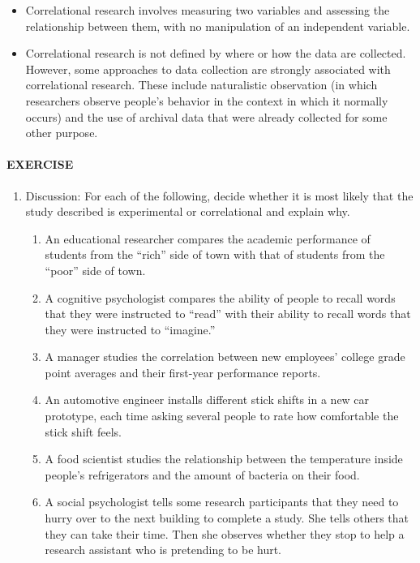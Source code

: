 \documentclass[
]{krantz}
\providecommand{\tightlist}{%
  \setlength{\itemsep}{0pt}\setlength{\parskip}{0pt}}
\begin{document}
\begin{itemize}
\tightlist
\item
  Correlational research involves measuring two variables and assessing the relationship between them, with no manipulation of an independent variable.
\item
  Correlational research is not defined by where or how the data are collected. However, some approaches to data collection are strongly associated with correlational research. These include naturalistic observation (in which researchers observe people's behavior in the context in which it normally occurs) and the use of archival data that were already collected for some other purpose.
\end{itemize}

\hypertarget{exercise-4}{%
\paragraph*{EXERCISE}\label{exercise-4}}

\begin{enumerate}
\def\labelenumi{\arabic{enumi}.}
\tightlist
\item
  Discussion: For each of the following, decide whether it is most likely that the study described is experimental or correlational and explain why.

  \begin{enumerate}
  \def\labelenumii{\alph{enumii}.}
  \tightlist
  \item
    An educational researcher compares the academic performance of students from the ``rich'' side of town with that of students from the ``poor'' side of town.
  \item
    A cognitive psychologist compares the ability of people to recall words that they were instructed to ``read'' with their ability to recall words that they were instructed to ``imagine.''
  \item
    A manager studies the correlation between new employees' college grade point averages and their first-year performance reports.
  \item
    An automotive engineer installs different stick shifts in a new car prototype, each time asking several people to rate how comfortable the stick shift feels.
  \item
    A food scientist studies the relationship between the temperature inside people's refrigerators and the amount of bacteria on their food.
  \item
    A social psychologist tells some research participants that they need to hurry over to the next building to complete a study. She tells others that they can take their time. Then she observes whether they stop to help a research assistant who is pretending to be hurt.
  \end{enumerate}
\end{enumerate}
\end{document}

